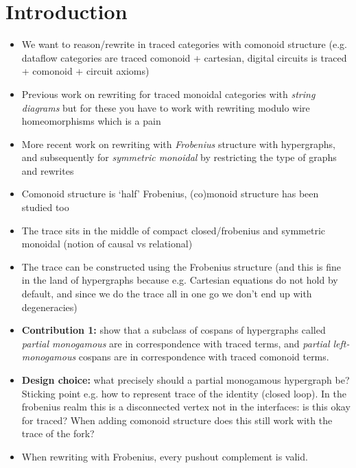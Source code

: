 \section{Introduction}

\begin{itemize}
    \item We want to reason/rewrite in traced categories with comonoid structure
            (e.g. dataflow categories are traced comonoid + cartesian,
            digital circuits is traced + comonoid + circuit axioms)
    \item Previous work on rewriting for traced monoidal categories with
            \emph{string diagrams} \cite{kissinger2012pictures,dixon2013opengraphs}
            but for these you have to work with rewriting modulo wire homeomorphisms
            which is a pain
    \item More recent work on rewriting with \emph{Frobenius} \cite{bonchi2022string}
            structure with hypergraphs, and subsequently for \emph{symmetric monoidal}
            by restricting the type of graphs and rewrites \cite{bonchi2022stringa}
    \item Comonoid structure is `half' Frobenius, (co)monoid structure has been studied
        too \cite{fritz2022free,milosavljevic2022string}
    \item The trace sits in the middle of compact closed/frobenius and symmetric
        monoidal (notion of causal vs relational)
    \item The trace can be constructed using the Frobenius structure (and this
        is fine in the land of hypergraphs because e.g. Cartesian equations do
        not hold by default, and since we do the trace all in one go we don't
        end up with degeneracies)
    \item \textbf{Contribution 1:} show that a subclass of cospans of hypergraphs
        called \emph{partial monogamous} are in correspondence with
        traced terms, and \emph{partial left-monogamous} cospans are in
        correspondence with traced comonoid terms.
    \item \textbf{Design choice:} what precisely should a partial monogamous
        hypergraph be? Sticking point e.g. how to represent trace of the
        identity (closed loop). In the frobenius realm this is a disconnected
        vertex not in the interfaces: is this okay for traced? When adding
        comonoid structure does this still work with the trace of the fork?
    \item When rewriting with Frobenius, every pushout complement is valid.

\end{itemize}

